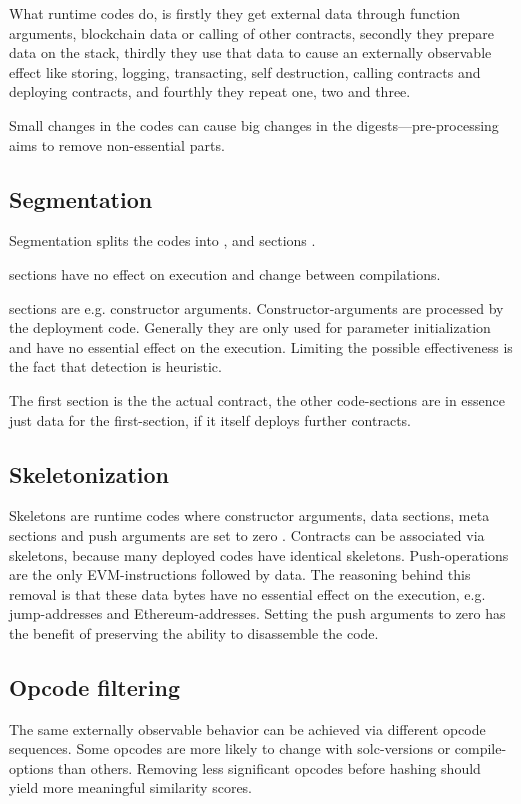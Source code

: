 \documentclass[../main.tex]{subfiles}
\begin{document}
What runtime codes do, is firstly they get external data through function arguments, blockchain data or calling of other contracts, secondly they prepare data on the stack, thirdly they use that data to cause an externally observable effect like storing, logging, transacting, self destruction, calling contracts and deploying contracts, and fourthly they repeat one, two and three.

Small changes in the codes can cause big changes in the digests---pre-processing aims to remove non-essential parts.

\subsection{Segmentation \label{sec:seg}}
Segmentation splits the codes into ,  and  sections \cite{ethutils}.

 sections have no effect on execution and change between compilations.

 sections are e.g. constructor arguments.
Constructor-arguments are processed by the deployment code.
Generally they are only used for parameter initialization and have no essential effect on the execution.
Limiting the possible effectiveness is the fact that detection is heuristic.

The first  section is the the actual contract, the other code-sections are in essence just data for the first-section, if it itself deploys further contracts.

\subsection{Skeletonization \label{sec:skel}}
Skeletons are runtime codes where constructor arguments, data sections, meta sections and push arguments are set to zero \cite{ethutils}.
Contracts can be associated via skeletons, because many deployed codes have identical skeletons.
Push-operations are the only EVM-instructions followed by data.
The reasoning behind this removal is that these data bytes have no essential effect on the execution, e.g. jump-addresses and Ethereum-addresses.
Setting the push arguments to zero has the benefit of preserving the ability to disassemble the code.

\subsection{Opcode filtering}
The same externally observable behavior can be achieved via different opcode sequences.
Some opcodes are more likely to change with solc-versions or compile-options than others.
Removing less significant opcodes before hashing should yield more meaningful similarity scores.
\end{document}
